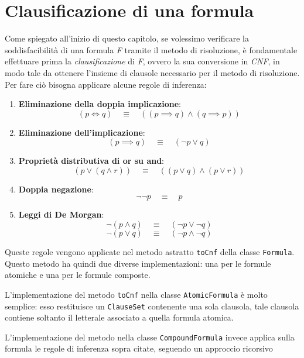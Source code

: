 \documentclass[a4paper,12pt]{report}
\begin{document}
\section{Clausificazione di una formula}
\label{clausification}
Come spiegato all'inizio di questo capitolo, se volessimo verificare la soddisfacibilità di una formula \emph{F} tramite il metodo di risoluzione, è fondamentale effettuare prima la \emph{clausificazione} di \emph{F}, ovvero la sua conversione in \emph{CNF}, in modo tale da ottenere l'insieme di clausole necessario per il metodo di risoluzione. Per fare ciò bisogna applicare alcune regole di inferenza:
\begin{enumerate}
    \item \textbf{Eliminazione della doppia implicazione}: 
    \[
    (p \iff q) \quad \equiv \quad ((p \implies q) \land (q \implies p))
    \]
    
    \item \textbf{Eliminazione dell'implicazione}: 
    \[
    (p \implies q) \quad \equiv \quad (\lnot p \lor q)
    \]
    
    \item \textbf{Proprietà distributiva di or su and}:
    \[
    (p \lor (q \land r)) \quad \equiv \quad ((p \lor q) \land (p \lor r))
    \]
    
    \item \textbf{Doppia negazione}:
    \[
    \lnot\lnot p \quad \equiv \quad p
    \]
    
    \item \textbf{Leggi di De Morgan}:
    \[
    \lnot(p \land q) \quad \equiv \quad (\lnot p \lor \lnot q)
    \]
    \[
    \lnot(p \lor q) \quad \equiv \quad (\lnot p \land \lnot q)
    \]
\end{enumerate}

Queste regole vengono applicate nel metodo astratto \texttt{toCnf} della classe \texttt{Formula}. Questo metodo ha quindi due diverse implementazioni: una per le formule atomiche e una per le formule composte.

L'implementazione del metodo \texttt{toCnf} nella classe \texttt{AtomicFormula} è molto semplice: esso restituisce un \texttt{ClauseSet} contenente una sola clausola, tale clausola contiene soltanto il letterale associato a quella formula atomica.
 
L'implementazione del metodo nella classe \texttt{CompoundFormula} invece applica sulla formula le regole di inferenza sopra citate, seguendo un approccio ricorsivo
\end{document}
